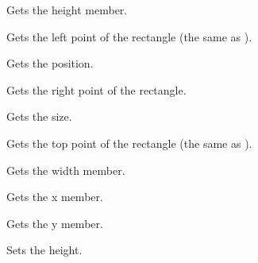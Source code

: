 \label{wxrectgetheight}


Gets the height member.

\label{wxrectgetleft}


Gets the left point of the rectangle (the same as ).

\label{wxrectgetposition}


Gets the position.

\label{wxrectgetright}


Gets the right point of the rectangle.

\label{wxrectgetsize}


Gets the size.

\label{wxrectgettop}


Gets the top point of the rectangle (the same as ).

\label{wxrectgetwidth}


Gets the width member.

\label{wxrectgetx}


Gets the x member.

\label{wxrectgety}


Gets the y member.

\label{wxrectsetheight}


Sets the height.

\label{wxrectsetwidth}


